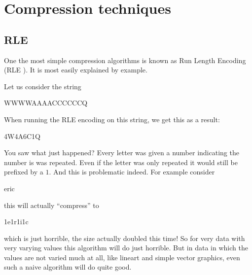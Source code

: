 \begin{comment}
  
\end{comment}

\chapter{Compression techniques}
\label{cha:digital-image}

\newenvironment{indentpar}[1][1cm]%
{\begin{list}{}%
         {\setlength{\leftmargin}{#1}}%
         \item[]%
}
{\end{list}}

\begin{refsection}

\section{RLE}
\label{sec:rle}

One the most simple compression algorithms is known as Run Length
Encoding (RLE
). \cite{nagarajan11:_enhan_approac_run_lengt_encod_schem}
It is most easily explained by example.

Let us consider the string

\begin{indentpar}
  WWWWAAAACCCCCCQ
\end{indentpar}

When running the RLE encoding on this string, we get this as a result:

\begin{indentpar}
  4W4A6C1Q
\end{indentpar}

You saw what just happened? Every letter was given a number indicating
the number is was repeated. Even if the letter was only repeated it
would still be prefixed by a $1$. And this is problematic indeed. For
example consider

\begin{indentpar}
  eric
\end{indentpar}

this will actually ``compress'' to

\begin{indentpar}
  1e1r1i1c
\end{indentpar}

which is just horrible, the size actually doubled this time! So for
very data with very varying values this algorithm will do just
horrible. But in data in which the values are not varied much at all,
like lineart and simple vector graphics, even such a naive algorithm
will do quite good.


\end{refsection}
